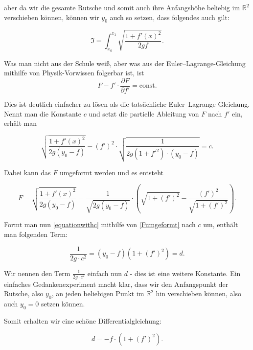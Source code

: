 aber da wir die gesamte Rutsche und somit auch ihre Anfangshöhe beliebig im $\mathbb{R}^2$ verschieben können, können wir $y_0$ auch so setzen, dass folgendes auch gilt:

\begin{equation}
 \mathfrak{I}= \int_{x_0}^{x_1} \sqrt{\frac{1+f'(x)^2}{2gf}}.
\end{equation}


Was man nicht aus der Schule weiß, aber was aus der Euler--Lagrange-Gleichung mithilfe von Physik-Vorwissen folgerbar ist, ist 
\begin{equation}
 F - f' \cdot \frac{\partial F}{\partial f'} = \text{const.}
\end{equation}

Dies ist deutlich einfacher zu lösen als die tatsächliche Euler--Lagrange-Gleichung. 
Nennt man die Konstante $c$ und setzt die partielle Ableitung von $F$ nach $f'$ ein, erhält man

\begin{equation}\label{equationwithc}
 \sqrt{\frac{1+f'(x)^2}{2g(y_0-f)}} - (f')^2 \cdot \sqrt{\frac{1}{2g(1+{f'}^2) \cdot (y_0 - f)}} = c.
\end{equation}

Dabei kann das $F$ umgeformt werden und es entsteht

\begin{equation}\label{Fumgeformt}
F=\sqrt{\frac{1+f'(x)^2}{2g(y_0-f)}}
= \frac{1}{\sqrt{2g(y_0-f)}} \cdot \left( \sqrt{1+(f')^2}- \frac{(f')^2}{\sqrt{1+(f')^2}}\right).
\end{equation}

Formt man nun \ref{equationwithc} mithilfe von \ref{Fumgeformt} nach $c$ um, enthält man folgenden Term:

\begin{equation}
 \frac{1}{2g\cdot c^2}= (y_0-f)(1+(f')^2)= d.
\end{equation}

Wir nennen den Term $\frac{1}{2g\cdot c^2}$ einfach nun $d$ - dies ist eine weitere Konstante.
Ein einfaches Gedankenexperiment macht klar, dass wir den Anfangspunkt der Rutsche, also $y_0$, an jeden beliebigen Punkt im $\mathbb{R}^2$ hin verschieben können, also auch $y_0=0$ setzen können. 

Somit erhalten wir eine schöne Differentialgleichung:

\begin{equation}\label{DGL,yay!}
 d=-f\cdot (1+(f')^2).
\end{equation}


